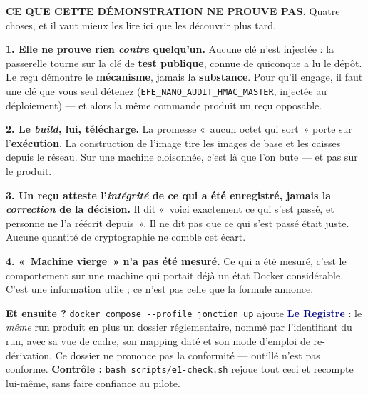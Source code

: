 \documentclass[9pt]{extarticle}
\newcommand{\code}[1]{\texttt{\footnotesize #1}}
\newcommand{\mm}[1]{\textbf{\textcolor{navy}{#1}}}
\begin{document}
\begin{alerte}
\textbf{CE QUE CETTE DÉMONSTRATION NE PROUVE PAS.} Quatre choses, et il vaut mieux les lire ici
que les découvrir plus tard.

\smallskip
\textbf{1. Elle ne prouve rien \emph{contre} quelqu'un.} Aucune clé n'est injectée : la passerelle
tourne sur la clé de \textbf{test publique}, connue de quiconque a lu le dépôt. Le reçu démontre
le \textbf{mécanisme}, jamais la \textbf{substance}. Pour qu'il engage, il faut une clé que vous
seul détenez (\code{EFE\_NANO\_AUDIT\_HMAC\_MASTER}, injectée au déploiement) --- et alors la même
commande produit un reçu opposable.

\textbf{2. Le \emph{build}, lui, télécharge.} La promesse «~aucun octet qui sort~» porte sur
l'\textbf{exécution}. La construction de l'image tire les images de base et les caisses depuis le
réseau. Sur une machine cloisonnée, c'est là que l'on bute --- et pas sur le produit.

\textbf{3. Un reçu atteste l'\emph{intégrité} de ce qui a été enregistré, jamais la
\emph{correction} de la décision.} Il dit «~voici exactement ce qui s'est passé, et personne ne
l'a réécrit depuis~». Il ne dit pas que ce qui s'est passé était juste. Aucune quantité de
cryptographie ne comble cet écart.

\textbf{4. «~Machine vierge~» n'a pas été mesuré.} Ce qui a été mesuré, c'est le comportement sur
une machine qui portait déjà un état Docker considérable. C'est une information utile ; ce n'est
pas celle que la formule annonce.
\end{alerte}

\vspace{1.5pt}
{\footnotesize\color{grey}
\textbf{Et ensuite ?} \code{docker compose -{}-profile jonction up} ajoute \mm{Le Registre} : le
\emph{même} run produit en plus un dossier réglementaire, nommé par l'identifiant du run, avec sa
vue de cadre, son mapping daté et son mode d'emploi de re-dérivation. Ce dossier ne prononce pas
la conformité --- outillé n'est pas conforme.
\hfill\textbf{Contrôle :} \code{bash scripts/e1-check.sh} rejoue tout ceci et recompte lui-même,
sans faire confiance au pilote.}
\end{document}
